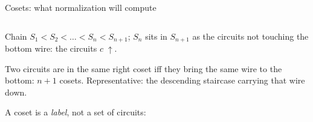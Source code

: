 \begin{frame}{Cosets: what normalization will compute \InPaper}
\begin{columns}[c]
\begin{column}{0.52\textwidth}
Chain $S_1 < S_2 < \dots < S_n < S_{n+1}$; $S_n$ sits in $S_{n+1}$ as the
circuits \alert{not touching the bottom wire}: the circuits $c\;{\uparrow}$.

\vspace{4pt}
Two circuits are in the same right coset iff they bring the \alert{same wire
to the bottom}: $n{+}1$ cosets. Representative: the \alert{descending
staircase} carrying that wire down.

\vspace{4pt}
A coset is a \emph{label}, not a set of circuits:
\begin{code}%
\>[0]\AgdaSpace{}%
\AgdaSpace{}%
\AgdaSymbol{:}\AgdaSpace{}%
\AgdaSpace{}%
\AgdaSpace{}%
\AgdaSpace{}%
\<%
\\
\>[0][@{}l@{\AgdaIndent{0}}]%
\>[2]%
\>[6]\AgdaSymbol{:}\AgdaSpace{}%
\AgdaSpace{}%
\<%
\\
%
\>[2]\AgdaSpace{}%
\AgdaSymbol{:}\AgdaSpace{}%
\AgdaSpace{}%
\AgdaSpace{}%
\AgdaSpace{}%
\AgdaSpace{}%
\AgdaSymbol{(}\AgdaSpace{}%
\AgdaSymbol{)}\<%
\\
\>[0]\AgdaSpace{}%
\AgdaSymbol{:}\AgdaSpace{}%
\AgdaSpace{}%
\AgdaSpace{}%
\AgdaSpace{}%
\AgdaSpace{}%
\AgdaSymbol{(}\AgdaSpace{}%
\AgdaSymbol{)}\<%
\\
\>[0]\AgdaOperator{\AgdaFunction{[}}\AgdaSpace{}%
\AgdaSpace{}%
\AgdaOperator{\AgdaFunction{]ᶜ}}%
\>[11]\AgdaSymbol{=}\AgdaSpace{}%
\<%
\\
\>[0]\AgdaOperator{\AgdaFunction{[}}\AgdaSpace{}%
\AgdaSpace{}%
\AgdaSpace{}%
\AgdaOperator{\AgdaFunction{]ᶜ}}%
\>[11]\AgdaSymbol{=}\AgdaSpace{}%
\AgdaSpace{}%
\AgdaSpace{}%
\AgdaSymbol{(}\AgdaOperator{\AgdaFunction{[}}\AgdaSpace{}%

\end{code}
\end{column}
\end{columns}
\end{frame}
